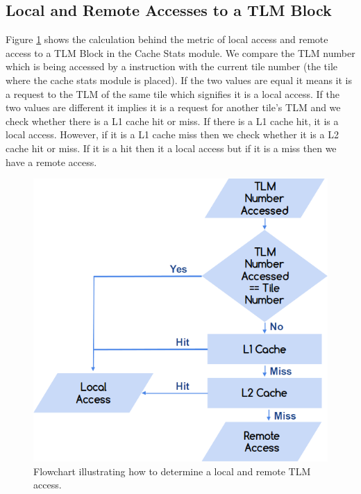 \documentclass{listhesis}
\begin{document}
\subsection{Local and Remote Accesses to a TLM Block}
Figure \ref{fig:remoteLocalAccess} shows the calculation behind the metric of local access and remote access to a TLM Block in the Cache Stats module. We compare the TLM number which is being accessed by a instruction with the current tile number (the tile where the cache stats module is placed). If the two values are equal it means it is a request to the TLM of the same tile which signifies it is a local access. If the two values are different it implies it is a request for another tile's TLM and we check whether there is a L1 cache hit or miss. If there is a L1 cache hit, it is a local access. However, if it is a L1 cache miss then we check whether it is a L2 cache hit or miss. If it is a hit then it a local access but if it is a miss then we have a remote access. \\
\begin{figure}
  \includegraphics[width=0.6\linewidth]{localandremote.png}
  \centering
  \caption{Flowchart illustrating how to determine a local and remote TLM access.}
  \label{fig:remoteLocalAccess}
\end{figure}
\end{document}
